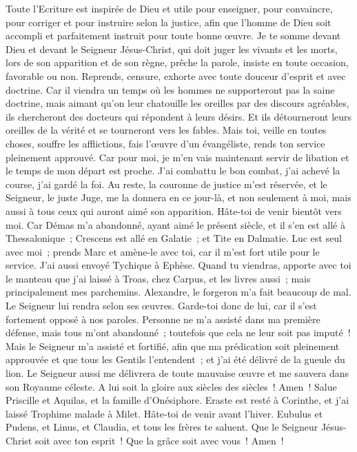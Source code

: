 \begin{multicols}{2}
Toute l'Ecriture est inspirée de Dieu et utile pour enseigner, pour convaincre, pour corriger et pour instruire selon la justice,
afin que l'homme de Dieu soit accompli et parfaitement instruit pour toute bonne œuvre.
\VerseOne{}Je te somme devant Dieu et devant le Seigneur Jésus-Christ, qui doit juger les vivants et les morts, lors de son apparition et de son règne,
prêche la parole, insiste en toute occasion, favorable ou non. Reprends, censure, exhorte avec toute douceur d'esprit et avec doctrine.
Car il viendra un temps où les hommes ne supporteront pas la saine doctrine, mais aimant qu'on leur chatouille les oreilles par des discours agréables, ils chercheront des docteurs qui répondent à leurs désirs.
Et ils détourneront leurs oreilles de la vérité et se tourneront vers les fables.
Mais toi, veille en toutes choses, souffre les afflictions, fais l'œuvre d'un évangéliste, rends ton service pleinement approuvé.
Car pour moi, je m'en vais maintenant servir de libation et le temps de mon départ est proche.
J'ai combattu le bon combat, j'ai achevé la course, j'ai gardé la foi.
Au reste, la couronne de justice m'est réservée, et le Seigneur, le juste Juge, me la donnera en ce jour-là, et non seulement à moi, mais aussi à tous ceux qui auront aimé son apparition.
Hâte-toi de venir bientôt vers moi.
Car Démas m'a abandonné, ayant aimé le présent siècle, et il s'en est allé à Thessalonique~; Crescens est allé en Galatie~; et Tite en Dalmatie.
Luc est seul avec moi~; prends Marc et amène-le avec toi, car il m'est fort utile pour le service.
J'ai aussi envoyé Tychique à Ephèse.
Quand tu viendras, apporte avec toi le manteau que j'ai laissé à Troas, chez Carpus, et les livres aussi~; mais principalement mes parchemins.
Alexandre, le forgeron m'a fait beaucoup de mal. Le Seigneur lui rendra selon ses œuvres.
Garde-toi donc de lui, car il s'est fortement opposé à nos paroles.
Personne ne m'a assisté dans ma première défense, mais tous m'ont abandonné~; toutefois que cela ne leur soit pas imputé~!
Mais le Seigneur m'a assisté et fortifié, afin que ma prédication soit pleinement approuvée et que tous les Gentils l'entendent~; et j'ai été délivré de la gueule du lion.
Le Seigneur aussi me délivrera de toute mauvaise œuvre et me sauvera dans son Royaume céleste. A lui soit la gloire aux siècles des siècles~! Amen~!
Salue Priscille et Aquilas, et la famille d'Onésiphore.
Eraste est resté à Corinthe, et j'ai laissé Trophime malade à Milet.
Hâte-toi de venir avant l'hiver. Eubulus et Pudens, et Linus, et Claudia, et tous les frères te saluent.
Que le Seigneur Jésus-Christ soit avec ton esprit~! Que la grâce soit avec vous~! Amen~!
\PPE{}
\end{multicols}
